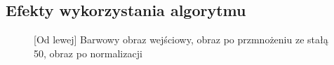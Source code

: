 \documentclass[a4paper,12pt, titlepage]{report}
\begin{document}
\subsection*{Efekty wykorzystania algorytmu}
\begin{figure}[h]
    \centering
    \caption{[Od lewej] Barwowy obraz wejściowy, obraz po przmnożeniu ze stałą 50, obraz po normalizacji}%
    \label{fig:rysunek}%
\end{figure}
\FloatBarrier
\end{document}
